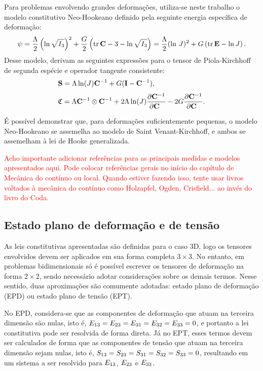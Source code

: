 \documentclass[Tese.tex]{subfiles}
\begin{document}
Para problemas envolvendo grandes deformações, utiliza-se neste trabalho o modelo constitutivo Neo-Hookeano definido pela seguinte energia específica de deformação:
\begin{equation}\label{eq:neoHookean2}
\psi = \dfrac{\Lambda}{2}\left(\ln\sqrt{I_3}\right)^2 + \dfrac{G}{2}\left(\text{tr}\,\mathbf{C} - 3 - \ln\sqrt{I_3}\right) = \dfrac{\Lambda}{2}(\ln\,J)^2 + {G}\left(\text{tr}\,\mathbf{E} - \ln J\right) .
\end{equation}
Desse modelo, derivam as seguintes expressões para o tensor de Piola-Kirchhoff de segunda espécie e operador tangente consistente:
\begin{align}
&\mathbf{S}=\Lambda\ln(J)\mathbf{C}^{-1} + G(\mathbf{I}-\mathbf{C}^{-1}), \\[0.1cm]
&\mathfrak{C}=\Lambda\mathbf{C}^{-1}\otimes\mathbf{C}^{-1}+2\Lambda\ln(J)\dfrac{\partial\mathbf{C}^{-1}}{\partial\mathbf{C}^{\;\;}} - 2G\dfrac{\partial\mathbf{C}^{-1}}{\partial\mathbf{C}^{\;\;}} .
\end{align}

É possível demonstrar que, para deformações suficientemente pequenas, o modelo Neo-Hookeano se assemelha ao modelo de Saint Venant-Kirchhoff, e ambos se assemelham à lei de Hooke generalizada.

\textcolor{red}{Acho importante adicionar referências para as principais medidas e modelos apresentados aqui. Pode colocar referências gerais no início do capítulo de Mecânica do contínuo ou local. Quando estiver fazendo isso, tente usar livros voltados à mecânica do contínuo como Holzapfel, Ogden, Crisfield... ao invés do livro do Coda.}

\subsection{Estado plano de deformação e de tensão}\label{subsec:estado-plano}

As leis constitutivas apresentadas são definidas para o caso 3D, logo os tensores envolvidos devem ser aplicados em sua forma completa $3\times 3$. No entanto, em problemas bidimensionais só é possível escrever os tensores de deformação na forma $2\times 2$, sendo necessário adotar considerações sobre os demais termos. Nesse sentido, duas aproximações são comumente adotadas: estado plano de deformação (EPD) ou estado plano de tensão (EPT).

No EPD, considera-se que as componentes de deformação que atuam na terceira dimensão são nulas, isto é, ${E}_{13}={E}_{23}={E}_{31}={E}_{32}={E}_{33}=0$, e portanto a lei constitutiva pode ser resolvida de forma direta. Já no EPT, esses termos devem ser calculados de forma que as componentes de tensão que atuam na terceira dimensão sejam nulas, isto é, ${S}_{13}={S}_{23}={S}_{31}={S}_{32}={S}_{33}=0$, resultando em um sistema a ser resolvido para ${E}_{13}$, ${E}_{23}$ e ${E}_{33}$.
\end{document}
